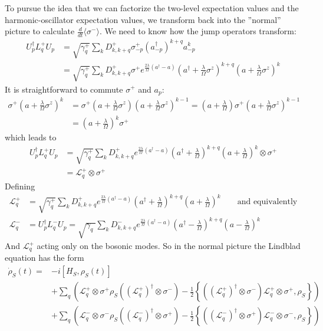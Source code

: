 	To pursue the idea that we can factorize the two-level expectation values and the harmonic-oscillator expectation values, we transform back into the ''normal'' picture to calculate $\frac{d}{dt} \langle \sigma^- \rangle $. We need to know how the jump operators transform:
	\begin{align}
		U_p^\dagger L_q^+ U_p &=	\sqrt{\gamma_q^+} \sum_k D_{k, k+q}^+ \sigma^+_{-p} (a^\dagger_{-p})^{k+q} a_{-p}^k \\
		&= \sqrt{\gamma_q^+} \sum_k D_{k, k+q}^+ \sigma^+ e^{\frac{2\lambda}{\Omega} \left(a^\dagger - a\right)} \left(a^\dagger + \frac{\lambda}{\Omega} \sigma^z\right)^{k+q} \left(a + \frac{\lambda}{\Omega} \sigma^z \right)^k
	\end{align}
	It is straightforward to commute $\sigma^+$ and $a_p$:
	\begin{align}
		\sigma^+ \left(a + \frac{\lambda}{\Omega} \sigma^z \right)^k &=	\sigma^+ \left(a + \frac{\lambda}{\Omega} \sigma^z \right) \left(a + \frac{\lambda}{\Omega} \sigma^z \right)^{k-1} =	\left(a + \frac{\lambda}{\Omega}\right) \sigma^+ \left(a + \frac{\lambda}{\Omega} \sigma^z \right)^{k-1} \\
		& =	\left(a + \frac{\lambda}{\Omega}\right)^k \sigma^+
	\end{align}
	which leads to
	\begin{align}
		U_p^\dagger L_q^+ U_p &=	\sqrt{\gamma_q^+} \sum_k D_{k, k+q}^+ e^{\frac{2\lambda}{\Omega} \left(a^\dagger - a\right)} \left(a^\dagger + \frac{\lambda}{\Omega}\right)^{k+q} \left(a + \frac{\lambda}{\Omega}\right)^k \otimes \sigma^+ \\
		&= \mathcal{L}_q^+ \otimes \sigma^+
	\end{align}
	Defining
	\begin{align}
		\mathcal{L}_q^+  &= \sqrt{\gamma_q^+} \sum_k D_{k, k+q}^+ e^{\frac{2\lambda}{\Omega} \left(a^\dagger - a\right)} \left(a^\dagger + \frac{\lambda}{\Omega}\right)^{k+q} \left(a + \frac{\lambda}{\Omega}\right)^k \qquad \text{and equivalently} \\
		\mathcal{L}_q^- &= U_p^\dagger L_q^- U_p =	\sqrt{\gamma_q^-} \sum_k D_{k, k+q}^- e^{\frac{2\lambda}{\Omega} \left(a^\dagger - a\right)} \left(a^\dagger- \frac{\lambda}{\Omega}\right)^{k+q} \left(a - \frac{\lambda}{\Omega}\right)^k
	\end{align}
	And $\mathcal{L}_q^+$ acting only on the bosonic modes. So in the normal picture the Lindblad equation has the form
	\begin{align}
		\dot{\rho}_S(t) = &-i \left[H_S,  {\rho}_S(t)\right] \\
		&+\sum_{q}^{}  \left(\mathcal{L}_q^+ \otimes \sigma^+ \rho_S \left(\left(\mathcal{L}_q^+\right)^\dagger \otimes \sigma^-\right) - \frac{1}{2} \left\{\left(\left(\mathcal{L}_q^+\right)^\dagger \otimes \sigma^-\right) \mathcal{L}_q^+ \otimes \sigma^+, \rho_S \right\}\right) \\
		&+\sum_{q}^{}  \left(\mathcal{L}_q^- \otimes \sigma^- \rho_S \left(\left(\mathcal{L}_q^-\right)^\dagger \otimes \sigma^+\right) - \frac{1}{2} \left\{\left(\left(\mathcal{L}_q^-\right)^\dagger \otimes \sigma^+\right) \mathcal{L}_q^- \otimes \sigma^-, \rho_S \right\}\right)
	\end{align}
